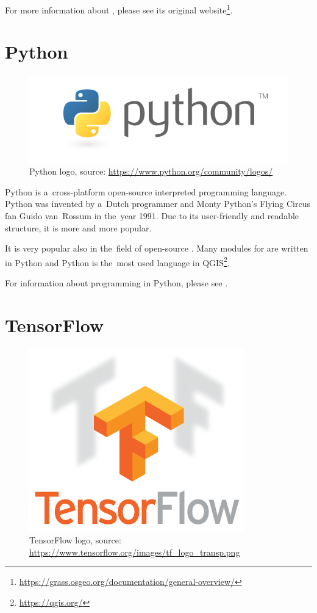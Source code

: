 For more information about  , please see its original 
website\footnote{\url{https://grass.osgeo.org/documentation/general-overview/}}.

\section{Python}
\label{python}

\begin{figure}[H]
   \centering
	\includegraphics[width=\linewidth]{./pictures/python-logo.png}
	\caption[Python logo]{Python logo, source: \url{https://www.python.org/community/logos/}}
      \label{fig:python-logo}
\end{figure}

Python is a~cross-platform open-source interpreted programming language. Python 
was invented by a~Dutch programmer and Monty Python's Flying Circus fan Guido 
van~Rossum in the~year 1991. Due to its user-friendly and readable structure, it is 
more and more popular.

It is very popular also in the~field of open-source . Many modules for 
  are written in Python and Python is the~most used language 
in QGIS\footnote{\url{https://qgis.org/}}.

For information about programming in Python, please see \cite{diveintopython}.

\section{TensorFlow}
\label{tf}

\begin{figure}[H]
   \centering
	\includegraphics[scale=0.5]{./pictures/tf-logo.png}
	\caption[TensorFlow logo]{TensorFlow logo, source: \url{https://www.tensorflow.org/images/tf_logo_transp.png}}
      \label{fig:tf-logo}
\end{figure}


